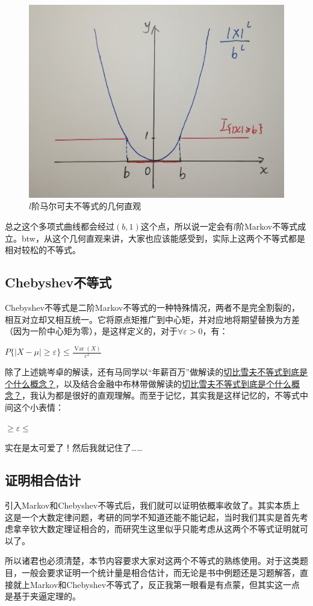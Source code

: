 \documentclass[10pt, a4paper]{article}
\begin{document}
\begin{figure}[H]
    \centering
    \includegraphics[width=0.8\linewidth]{l-markov.jpg}
    \caption{$l$阶马尔可夫不等式的几何直观}
    \label{fig:lmarkov}
\end{figure}

总之这个多项式曲线都会经过$(b,1)$这个点，所以说一定会有$l$阶Markov不等式成立。btw，从这个几何直观来讲，大家也应该能感受到，实际上这两个不等式都是相对较松的不等式。

\subsection*{Chebyshev不等式}
Chebyshev不等式是二阶Markov不等式的一种特殊情况，两者不是完全割裂的，相互对立却又相互统一。它将原点矩推广到中心矩，并对应地将期望替换为方差（因为一阶中心矩为零），是这样定义的，对于$\forall \varepsilon > 0$，有：
\begin{center}
    $P\{|X-\mu| \geq \varepsilon\} \leq \frac{\operatorname{Var}(X)}{\varepsilon^{2}}$
\end{center} \par

除了上述姚岑卓的解读，还有马同学以“年薪百万”做解读的\href{https://www.zhihu.com/question/27821324/answer/248693398}{切比雪夫不等式到底是个什么概念？}，以及结合金融中布林带做解读的\href{https://www.zhihu.com/question/27821324/answer/92675490}{切比雪夫不等式到底是个什么概念？}，我认为都是很好的直观理解。而至于记忆，其实我是这样记忆的，不等式中间这个小表情：
\begin{center}
    $\geq \varepsilon \leq$
\end{center} \par
实在是太可爱了！然后我就记住了……

\subsection{证明相合估计}
引入Markov和Chebyshev不等式后，我们就可以证明依概率收敛了。其实本质上这是一个大数定律问题，考研的同学不知道还能不能记起，当时我们其实是首先考虑拿辛钦大数定理证相合的，而研究生这里似乎只能考虑从这两个不等式证明就可以了。\par
所以诸君也必须清楚，本节内容要求大家对这两个不等式的熟练使用。对于这类题目，一般会要求证明一个统计量是相合估计，而无论是书中例题还是习题解答，直接就上Markov和Chebyshev不等式了，反正我第一眼看是有点蒙，但其实这一点是基于夹逼定理的。
\end{document}
